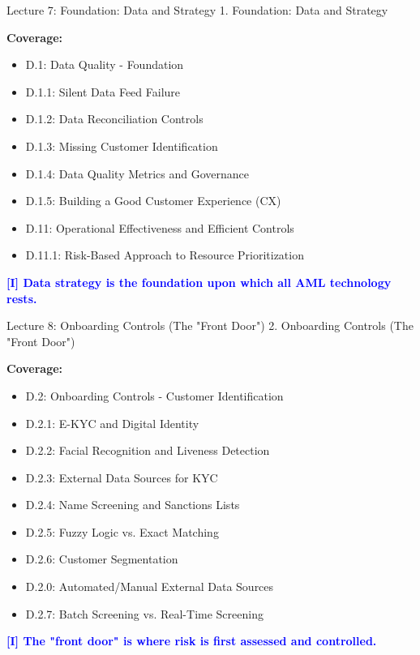 \documentclass[11pt,a4paper]{beamer}
\newcommand{\bluenote}[1]{\textcolor{blue}{\textbf{[I] #1}}}
\begin{document}
\begin{frame}{Lecture 7: Foundation: Data and Strategy}
	\centering
	\Large 1. Foundation: Data and Strategy
	\vspace{0.5cm}
	
	\textbf{Coverage:}
	\begin{itemize}
		\item D.1: Data Quality - Foundation
		\item D.1.1: Silent Data Feed Failure
		\item D.1.2: Data Reconciliation Controls
		\item D.1.3: Missing Customer Identification
		\item D.1.4: Data Quality Metrics and Governance
		\item D.1.5: Building a Good Customer Experience (CX)
		\item D.11: Operational Effectiveness and Efficient Controls
		\item D.11.1: Risk-Based Approach to Resource Prioritization
	\end{itemize}
	\bluenote{Data strategy is the foundation upon which all AML technology rests.}
\end{frame}


\begin{frame}{Lecture 8: Onboarding Controls (The "Front Door")}
	\centering
	\Large 2. Onboarding Controls (The "Front Door")
	\vspace{0.5cm}
	
	\textbf{Coverage:}
	\begin{itemize}
		\item D.2: Onboarding Controls - Customer Identification
		\item D.2.1: E-KYC and Digital Identity
		\item D.2.2: Facial Recognition and Liveness Detection
		\item D.2.3: External Data Sources for KYC
		\item D.2.4: Name Screening and Sanctions Lists
		\item D.2.5: Fuzzy Logic vs. Exact Matching
		\item D.2.6: Customer Segmentation
		\item D.2.0: Automated/Manual External Data Sources
		\item D.2.7: Batch Screening vs. Real-Time Screening
	\end{itemize}
	\bluenote{The "front door" is where risk is first assessed and controlled.}
\end{frame}
\end{document}

